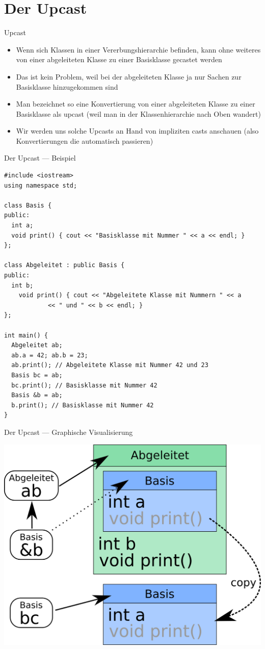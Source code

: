 \documentclass[presentation]{beamer}
\begin{document}
\section{Der Upcast}
\label{sec:org407bfe3}
\begin{frame}[label={sec:orgbfda550}]{Upcast}
\begin{itemize}
\item Wenn sich Klassen in einer Vererbungshierarchie befinden, kann ohne
weiteres von einer abgeleiteten Klasse zu einer Basisklasse gecastet
werden
\item Das ist kein Problem, weil bei der abgeleiteten Klasse ja nur Sachen
zur Basisklasse hinzugekommen sind
\item Man bezeichnet so eine Konvertierung von einer abgeleiteten Klasse
zu einer Basisklasse als \alert{upcast} (weil man in der Klassenhierarchie
nach Oben wandert)
\item Wir werden uns solche Upcasts an Hand von impliziten casts anschauen
(also Konvertierungen die automatisch passieren)
\end{itemize}
\end{frame}
\begin{frame}[label={sec:org4b71f2a},fragile]{Der Upcast --- Beispiel}
 \begin{verbatim}
#include <iostream>
using namespace std;

class Basis {
public:
  int a;
  void print() { cout << "Basisklasse mit Nummer " << a << endl; }
};

class Abgeleitet : public Basis {
public:
  int b;
    void print() { cout << "Abgeleitete Klasse mit Nummern " << a
			<< " und " << b << endl; }
};

int main() {
  Abgeleitet ab;
  ab.a = 42; ab.b = 23;
  ab.print(); // Abgeleitete Klasse mit Nummer 42 und 23
  Basis bc = ab;
  bc.print(); // Basisklasse mit Nummer 42
  Basis &b = ab;
  b.print(); // Basisklasse mit Nummer 42
}
\end{verbatim}
\end{frame}
\begin{frame}[label={sec:org9e6b32e}]{Der Upcast --- Graphische Visualisierung}
\begin{center}
\includegraphics[width=.9\linewidth]{img/slizing_full.png}
\end{center}
\end{frame}
\end{document}
